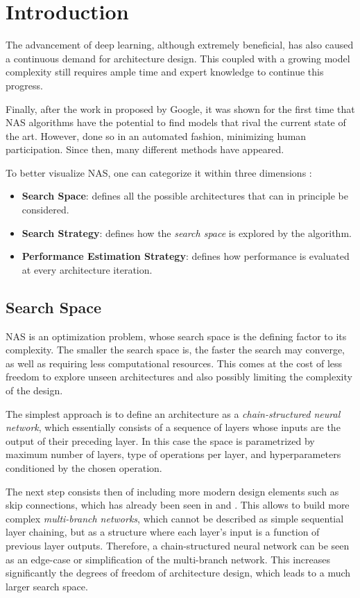 \documentclass[10pt,        %
               a4paper,     %
               journal,     %
               ]{IEEEtran}
\begin{document}
\section{Introduction}
The advancement of deep learning, although extremely beneficial, has also caused a continuous demand for
architecture design. This coupled with a growing model complexity still requires ample time and expert knowledge to
continue this progress.

Finally, after the work in \cite{zoph2016neural} proposed by Google, it was shown for the first time that NAS algorithms
have the potential to find models that rival the current state of the art. However, done so in an automated fashion, minimizing
human participation. Since then, many different methods have appeared.

To better visualize NAS, one can categorize it within three dimensions \cite{wistuba2019survey}:
\begin{itemize}
    \item \textbf{Search Space}: defines all the possible architectures that can in principle be considered.

    \item \textbf{Search Strategy}: defines how the \textit{search space} is explored by the algorithm.

    \item \textbf{Performance Estimation Strategy}: defines how performance is evaluated at every architecture iteration.
\end{itemize}

\subsection{Search Space}
NAS is an optimization problem, whose search space is the defining factor to its complexity.
The smaller the search space is, the faster the search may converge,
as well as requiring less computational resources. This comes at the cost of less freedom to
explore unseen architectures and also possibly limiting the complexity of the design.

The simplest approach is to define an architecture as a \textit{chain-structured neural network}, which essentially consists of a
sequence of layers whose inputs are the output of their preceding layer. In this case the space is parametrized by maximum number
of layers, type of operations per layer, and hyperparameters conditioned by the chosen operation.

The next step consists then of including more modern design elements such as skip connections, which has already been seen
in \cite{zoph2016neural} and \cite{pmlr-v70-real17a}. This allows to build more complex \textit{multi-branch networks}, which
cannot be described as simple sequential layer chaining, but as a structure where each layer's input is a function of
previous layer outputs. Therefore, a chain-structured neural network can be seen as an edge-case or simplification of the multi-branch network.
This increases significantly the degrees of freedom of architecture design, which leads to a much larger search space.
\end{document}
